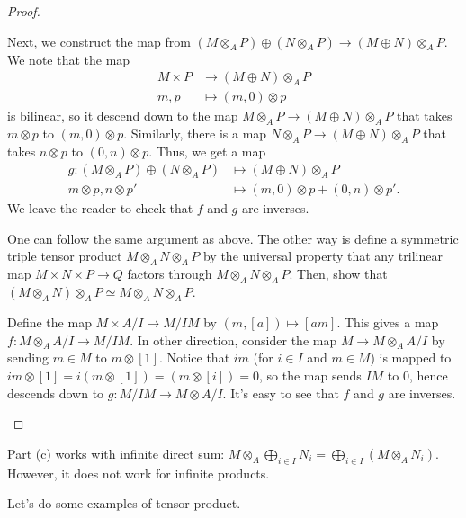 \begin{proof}
\begin{alphenum}
    Next, we construct the map from $(M\otimes_A P)
    \oplus (N\otimes_A P)\to (M\oplus N)\otimes_A P.$
    We note that the map
    \begin{align*}
    M\times P &\to (M\oplus N)\otimes_A P \\
    m,p &\mapsto (m,0)\otimes p
    \end{align*}
    is bilinear, so it descend down to the map 
    $M\otimes_A P \to (M\oplus N)\otimes_A P$
    that takes $m\otimes p$ to $(m,0)\otimes p$.
    Similarly, there is a map 
    $N\otimes_A P \to (M\oplus N) \otimes_A P$
    that takes $n\otimes p$ to $(0,n)\otimes p$.
    Thus, we get a map 
    \begin{align*}
    g : (M\otimes_A P) \oplus (N\otimes_A P) 
    &\mapsto (M\oplus N)\otimes_A P \\
    m\otimes p, n\otimes p' &\mapsto (m,0)\otimes p 
    + (0,n)\otimes p'.
    \end{align*}
    We leave the reader to check that $f$ and $g$
    are inverses.
    \item 
    One can follow the same argument as above.
    The other way is define a symmetric triple tensor product
    $M\otimes_A N\otimes_A P$ by the universal property
    that any trilinear map $M\times N\times P\to Q$
    factors through $M\otimes_A N\otimes_A P$.
    Then, show that $(M\otimes_A N) \otimes_A P 
    \simeq M\otimes_A N\otimes_A P$.
    \item 
    Define the map $M\times A/I\to M/IM$ by
    $(m,[a]) \mapsto [am]$.
    This gives a map $f : M\otimes_A A/I\to M/IM$.
    In other direction, consider the map $M\to M\otimes_A A/I$
    by sending $m\in M$ to $m\otimes [1]$.
    Notice that $im$ (for $i\in I$ and $m\in M$) is mapped to $im\otimes [1] = i(m\otimes [1]) = (m\otimes [i]) = 0$,
    so the map sends $IM$ to $0$, 
    hence descends down to $g : M/IM\to M\otimes A/I$.
    It's easy to see that $f$ and $g$ are inverses.
    \qedhere
    \end{alphenum}
\end{proof}
\begin{remark}
    Part (c) works with infinite direct sum:
    $M \otimes_A \bigoplus_{i\in I} N_i 
    = \bigoplus_{i\in I}(M\otimes_A N_i)$.
    However, it does not work for infinite products.
\end{remark}
Let's do some examples of tensor product.
